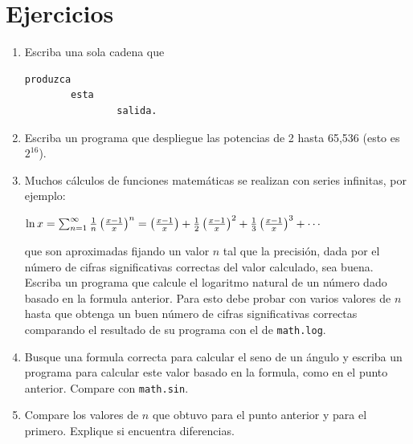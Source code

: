 \section{Ejercicios}


\begin{enumerate}

\item Escriba una sola cadena que

\beforeverb
\begin{verbatim}
produzca
        esta
                salida.
\end{verbatim}
\afterverb


 \item Escriba un programa que despliegue las
potencias de 2 hasta 65,536 (esto es $2^{16}$).  

 \item Muchos cálculos de funciones matemáticas se realizan con series infinitas, por ejemplo:

$\ln{x} = \sum_{n=1}^\infty {1 \over {n}} \left( {x - 1 \over x} \right)^n = \left( {x - 1 \over x} \right) + {1 \over 2} \left( {x - 1 \over x} \right)^2 + {1 \over 3} \left( {x - 1 \over x} \right)^3 + \cdots $

que son aproximadas fijando un valor $n$ tal que la precisión, dada por el número de cifras significativas
correctas del valor calculado, sea buena.
 Escriba un programa que calcule el logaritmo natural de un número dado basado en la formula anterior.
 Para esto debe probar con varios valores de $n$ hasta que obtenga un buen número de cifras significativas correctas
 comparando el resultado de su programa con el de \verb+math.log+.
 
 \item Busque una formula correcta para calcular el seno de un ángulo y escriba un programa para calcular
 este valor basado en la formula, como en el punto anterior. Compare con \verb+math.sin+. 
 
 \item Compare los valores de $n$  que obtuvo para el punto anterior y para el primero. Explique si encuentra
 diferencias.
 
 
\end{enumerate}